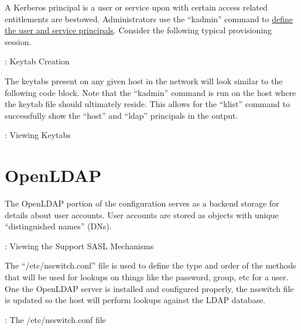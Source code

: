 \justifying
A Kerberos principal is a user or service upon with certain access related entitlements are bestowed. Administrators use the ``kadmin''
command to \href{https://web.mit.edu/kerberos/krb5-1.19/doc/admin/princ_dns.html}{define the user and service principals}. Consider the following typical 
provisioning session.

\begin{mybox}{\thetcbcounter: Keytab Creation}
	
\end{mybox}

The keytabs present on any given host in the network will look similar to the following code block. Note that the ``kadmin'' command is run on the
host where the keytab file should ultimately reside. This allows for the ``klist'' command to successfully show the ``host'' and ``ldap'' principals
in the output.

\begin{mybox}{\thetcbcounter: Viewing Keytabs}
	
\end{mybox}

\section{\label{sec:openldap}OpenLDAP}

The OpenLDAP portion of the configuration serves as a backend storage for details about user accounts. User accounts are stored as objects with
unique ``distinguished names'' (DNs). 

\vspace{2mm}
\vspace{2mm}

\begin{mybox}{\thetcbcounter: Viewing the Support SASL Mechanisms}
	
\end{mybox}


\justifying
The ``/etc/nsswitch.conf'' file is used to define the type and order of the methods that will be
used for lookups on things like the password, group, etc for a user. One the OpenLDAP server is installed and configured properly, the nsswitch file is updated so the host will perform lookups
against the LDAP database.

\begin{mybox}{\thetcbcounter: The /etc/nsswitch.conf file}
	
\end{mybox}

